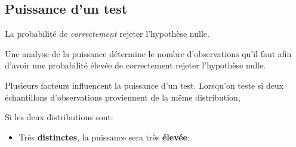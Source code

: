\documentclass[10pt, french]{article}
\begin{document}
\begin{multicols*}{2}
\columnbreak
\subsection{Puissance d'un test}
\begin{definitionNOHFILL}
La probabilité de \textit{correctement} rejeter l'hypothèse nulle.

\tcbline

Une analyse de la puissance détermine le nombre d'observations qu'il faut afin d'avoir une probabilité élevée de correctement rejeter l'hypothèse nulle.
\end{definitionNOHFILL}


Plusieurs facteurs influencent la puissance d'un test. Lorsqu'on teste si deux échantillons d'observations proviennent de la même distribution,
\begin{definitionNOHFILLsub}
Si les deux distributions sont:
\begin{itemize}
	\item	Très \textbf{distinctes}, la puissance sera très \textbf{élevée}:
		\begin{center}

\begin{tikzpicture}[x=0.75pt,y=0.75pt,yscale=-1,xscale=1]


\end{tikzpicture}
\end{center}
\end{itemize}
\end{definitionNOHFILLsub}
\end{multicols*}
\end{document}
